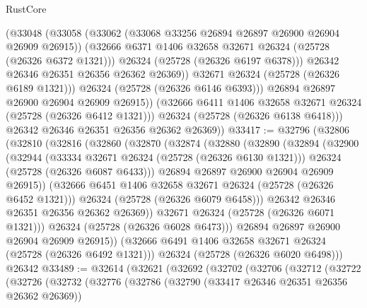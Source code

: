 \begin{lexlean}{RustCore}
\begin{coremodule}
                    (@33048
                      (@33058
                        (@33062 (@33068 @33256 @26894 @26897 @26900 @26904 @26909 @26915))
                        (@32666 @6371 @1406 @32658 @32671 @26324 (@25728 (@26326 @6372 @1321)))
                        @26324
                        (@25728 (@26326 @6197 @6378)))
                      @26342
                      @26346
                      @26351
                      @26356
                      @26362
                      @26369))
                  @32671
                  @26324
                  (@25728 (@26326 @6189 @1321)))
                @26324
                (@25728 (@26326 @6146 @6393)))
              @26894
              @26897
              @26900
              @26904
              @26909
              @26915))
          (@32666 @6411 @1406 @32658 @32671 @26324 (@25728 (@26326 @6412 @1321)))
          @26324
          (@25728 (@26326 @6138 @6418)))
        @26342
        @26346
        @26351
        @26356
        @26362
        @26369))
@33417 := @32796
    (@32806
      (@32810
        (@32816
          (@32860
            (@32870
              (@32874
                (@32880
                  (@32890
                    (@32894
                      (@32900
                        (@32944
                          (@33334 @32671 @26324 (@25728 (@26326 @6130 @1321)))
                          @26324
                          (@25728 (@26326 @6087 @6433)))
                        @26894
                        @26897
                        @26900
                        @26904
                        @26909
                        @26915))
                    (@32666 @6451 @1406 @32658 @32671 @26324 (@25728 (@26326 @6452 @1321)))
                    @26324
                    (@25728 (@26326 @6079 @6458)))
                  @26342
                  @26346
                  @26351
                  @26356
                  @26362
                  @26369))
              @32671
              @26324
              (@25728 (@26326 @6071 @1321)))
            @26324
            (@25728 (@26326 @6028 @6473)))
          @26894
          @26897
          @26900
          @26904
          @26909
          @26915))
      (@32666 @6491 @1406 @32658 @32671 @26324 (@25728 (@26326 @6492 @1321)))
      @26324
      (@25728 (@26326 @6020 @6498)))
    @26342
@33489 := @32614
    (@32621
      (@32692
        (@32702
          (@32706
            (@32712
              (@32722
                (@32726
                  (@32732
                    (@32776
                      (@32786
                        (@32790 (@33417 @26346 @26351 @26356 @26362 @26369))

\end{coremodule}
\end{lexlean}
